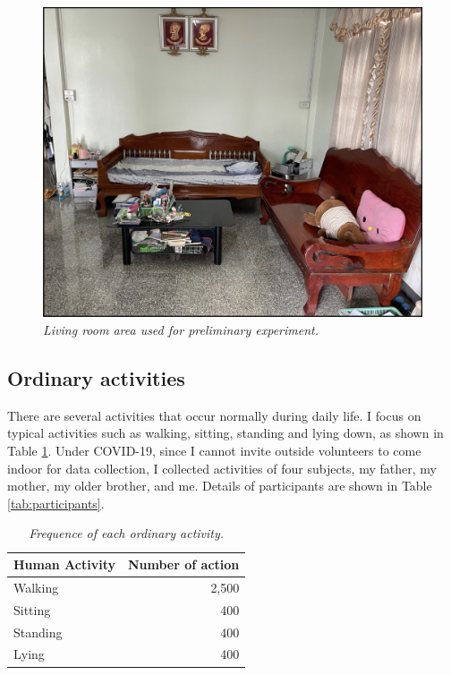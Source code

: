 \begin{figure}[H]
  \centering
  \caption[Living room area used for preliminary experiment.]{\emph{Living room area used for preliminary experiment.}}\label{fig:home}
  \includegraphics[scale = 0.2]{figures/home.jpg}
\end{figure}


\subsection{Ordinary activities}

There are several activities that occur normally during daily life. I focus on typical activities such as walking, sitting, standing and lying down, as shown in Table \ref{tab:number_action}. Under COVID-19, since I cannot invite outside volunteers to come indoor for data collection, I collected activities of four subjects, my father, my mother, my older brother, and me. Details of participants are shown in Table \ref{tab:participants}.

\begin{table}[H]
  \begin{center}
    \caption[Frequence of each ordinary activity.]{\emph{Frequence of each ordinary activity.} \\ \hspace{\textwidth}}\label{tab:number_action}
    \begin{tabular}{ l r }
      \textbf{Human Activity} & \textbf{Number of action} \\
      \hline
      Walking                 & 2,500                     \\
      \hline
      Sitting                 & 400                       \\
      \hline
      Standing                & 400                       \\
      \hline
      Lying                   & 400                       \\
      \hline
    \end{tabular}
  \end{center}
\end{table}

